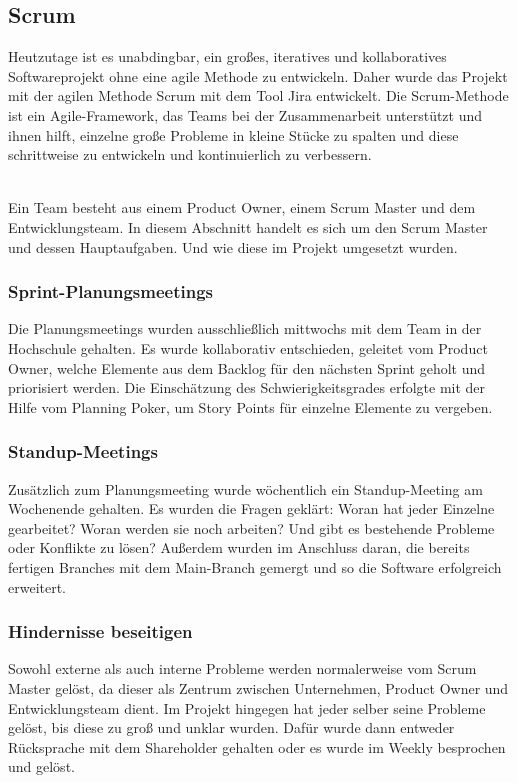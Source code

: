 \subsection{Scrum}
Heutzutage ist es unabdingbar, ein großes, iteratives und kollaboratives Softwareprojekt ohne eine agile Methode zu entwickeln. Daher wurde das Projekt mit der agilen Methode Scrum mit dem Tool Jira entwickelt. Die Scrum-Methode ist ein Agile-Framework, das Teams bei der Zusammenarbeit unterstützt und ihnen hilft, einzelne große Probleme in kleine Stücke zu spalten und diese schrittweise zu entwickeln und kontinuierlich zu verbessern.

\noindent
\\
Ein Team besteht aus einem Product Owner, einem Scrum Master und dem Entwicklungsteam. In diesem Abschnitt handelt es sich um den Scrum Master und dessen Hauptaufgaben. Und wie diese im Projekt umgesetzt wurden.

\subsubsection{Sprint-Planungsmeetings}
Die Planungsmeetings wurden ausschließlich mittwochs mit dem Team in der Hochschule gehalten. Es wurde kollaborativ entschieden, geleitet vom Product Owner, welche Elemente aus dem Backlog für den nächsten Sprint geholt und priorisiert werden. Die Einschätzung des Schwierigkeitsgrades erfolgte mit der Hilfe vom Planning Poker, um Story Points für einzelne Elemente zu vergeben.

\subsubsection{Standup-Meetings}
Zusätzlich zum Planungsmeeting wurde wöchentlich ein Standup-Meeting am Wochenende gehalten. Es wurden die Fragen geklärt: Woran hat jeder Einzelne gearbeitet? Woran werden sie noch arbeiten? Und gibt es bestehende Probleme oder Konflikte zu lösen? Außerdem wurden im Anschluss daran, die bereits fertigen Branches mit dem Main-Branch gemergt und so die Software erfolgreich erweitert.
\subsubsection{Hindernisse beseitigen}
Sowohl externe als auch interne Probleme werden normalerweise vom Scrum Master gelöst, da dieser als Zentrum zwischen Unternehmen, Product Owner und Entwicklungsteam dient. Im Projekt hingegen hat jeder selber seine Probleme gelöst, bis diese zu groß und unklar wurden. Dafür wurde dann entweder Rücksprache mit dem Shareholder gehalten oder es wurde im Weekly besprochen und gelöst.
